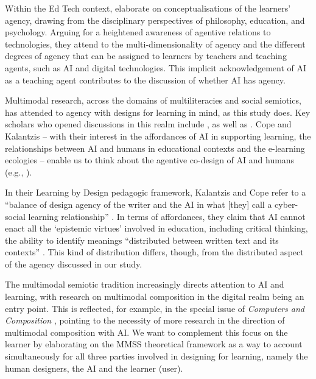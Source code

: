 \documentclass[english]{textolivre}
\begin{document}
Within the Ed Tech context, \textcite{brod2023agency} elaborate on conceptualisations of the learners’ agency, drawing from the disciplinary perspectives of philosophy, education, and psychology. Arguing for a heightened awareness of agentive relations to technologies, they attend to the multi-dimensionality of agency and the different degrees of agency that can be assigned to learners by teachers and teaching agents, such as AI and digital technologies. This implicit acknowledgement of AI as a teaching agent contributes to the discussion of whether AI has agency.

Multimodal research, across the domains of multiliteracies and social semiotics, has attended to agency with designs for learning in mind, as this study does. Key scholars who opened discussions in this realm include \textcite{cope2022artificial,cope2024a_multimodal,cope2024b_cybersocial}, as well as \textcite{lim2025editorial,jiang2025processgenre}. Cope and Kalantzis – with their interest in the affordances of AI in supporting learning, the relationships between AI and humans in educational contexts and the e-learning ecologies \cite{cope2021education} – enable us to think about the agentive co-design of AI and humans (e.g., \textcite{cope2022artificial,cope2024b_cybersocial}).

In their Learning by Design pedagogic framework, Kalantzis and Cope refer to a “balance of design agency of the writer and the AI in what [they] call a cyber-social learning relationship” \cite[p. 11]{karatza2024multimodal}. In terms of affordances, they claim that AI cannot enact all the ‘epistemic virtues’ involved in education, including critical thinking, the ability to identify meanings “distributed between written text and its contexts” \cite[p. 146]{cope2024a_multimodal}. This kind of distribution differs, though, from the distributed aspect of the agency discussed in our study.

The multimodal semiotic tradition increasingly directs attention to AI and learning, with research on multimodal composition in the digital realm being an entry point. This is reflected, for example, in the special issue of \textit{Computers and Composition} \cite{lim2025editorial}, pointing to the necessity of more research in the direction of multimodal composition with AI. We want to complement this focus on the learner by elaborating on the MMSS theoretical framework as a way to account simultaneously for all three parties involved in designing for learning, namely the human designers, the AI and the learner (user).
\end{document}
